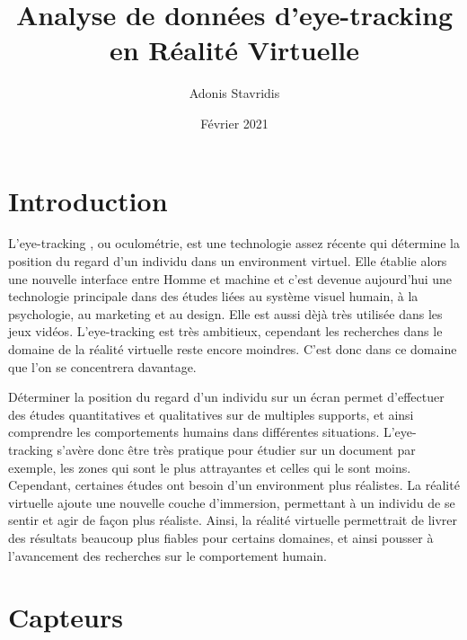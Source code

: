 \documentclass[12pt]{article}
\title{\textbf{Analyse de données d’eye-tracking en Réalité Virtuelle}}
\author{\Large{Adonis Stavridis}}
\date{Février 2021}
\begin{document}

\maketitle
\tableofcontents
\pagebreak


\section{Introduction}

L'eye-tracking \cite{wiki:eye_tracking}, ou oculométrie, est une technologie
assez récente qui détermine la position du regard d'un individu dans un
environment virtuel. Elle établie alors une nouvelle interface entre Homme et
machine et c'est devenue aujourd'hui une technologie principale dans des études
liées au système visuel humain, à la psychologie, au marketing et au design.
Elle est aussi dèjà très utilisée dans les jeux vidéos. L'eye-tracking est très
ambitieux, cependant les recherches dans le domaine de la réalité virtuelle
reste encore moindres. C'est donc dans ce domaine que l'on se concentrera
davantage.

\bigskip
Déterminer la position du regard d'un individu sur un écran permet d'effectuer
des études quantitatives et qualitatives sur de multiples supports, et ainsi
comprendre les comportements humains dans différentes situations. L'eye-tracking
s'avère donc être très pratique pour étudier sur un document par exemple, les
zones qui sont le plus attrayantes et celles qui le sont moins. Cependant,
certaines études ont besoin d'un environment plus réalistes. La réalité
virtuelle ajoute une nouvelle couche d'immersion, permettant à un individu de
se sentir et agir de façon plus réaliste. Ainsi, la réalité virtuelle
permettrait de livrer des résultats beaucoup plus fiables pour certains
domaines, et ainsi pousser à l'avancement des recherches sur le comportement
humain.


\section{Capteurs}
\end{document}

